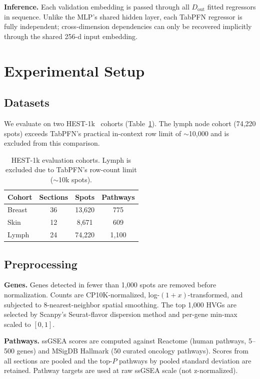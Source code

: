 \documentclass[conference]{IEEEtran}
\begin{document}
\textbf{Inference.}
Each validation embedding is passed through all $D_\text{out}$ fitted regressors
in sequence.
Unlike the MLP's shared hidden layer, each TabPFN regressor is fully independent;
cross-dimension dependencies can only be recovered implicitly through the shared
256-d input embedding.

\section{Experimental Setup}
\label{sec:setup}

\subsection{Datasets}

We evaluate on two HEST-1k~\cite{hest1k} cohorts (Table~\ref{tab:datasets}).
The lymph node cohort (74{,}220 spots) exceeds TabPFN's practical in-context
row limit of $\sim$10{,}000 and is excluded from this comparison.

\begin{table}[h]
\centering
\caption{HEST-1k evaluation cohorts. Lymph is excluded due to TabPFN's
row-count limit ($\sim$10k spots).}
\label{tab:datasets}
\begin{tabular}{lccc}
\toprule
\textbf{Cohort} & \textbf{Sections} & \textbf{Spots} & \textbf{Pathways} \\
\midrule
Breast & 36 & 13{,}620 & 775 \\
Skin   & 12 &  8{,}671 & 609 \\
Lymph  & 24 & 74{,}220 & 1{,}100 \\
\bottomrule
\end{tabular}
\end{table}

\subsection{Preprocessing}

\textbf{Genes.}
Genes detected in fewer than 1{,}000 spots are removed before normalization.
Counts are CP10K-normalized, log-$(1{+}x)$-transformed, and subjected to
8-nearest-neighbor spatial smoothing.
The top 1{,}000 HVGs are selected by Scanpy's Seurat-flavor dispersion method
and per-gene min-max scaled to $[0,1]$.

\textbf{Pathways.}
ssGSEA scores are computed against Reactome (human pathways, 5--500 genes) and
MSigDB Hallmark (50 curated oncology pathways).
Scores from all sections are pooled and the top-$P$ pathways by pooled
standard deviation are retained.
Pathway targets are used at raw ssGSEA scale (not z-normalized).
\end{document}
